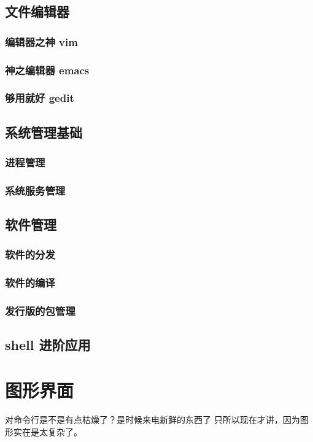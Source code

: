 \documentclass[amstex]{ctexbook}
\begin{document}
\section{文件编辑器}
\subsection{编辑器之神 vim	}
\subsection{神之编辑器 emacs	}
\subsection{够用就好 gedit	}
\section{系统管理基础}

\subsection{进程管理	}
\subsection{系统服务管理	}
\section{软件管理}
\subsection{ 软件的分发	}
\subsection{软件的编译	}
\subsection{  发行版的包管理}	
\section{ shell 进阶应用}
	
\chapter{图形界面}
对命令行是不是有点枯燥了？是时候来电新鲜的东西了 只所以现在才讲，因为图形实在是太复杂了。
\end{document}
